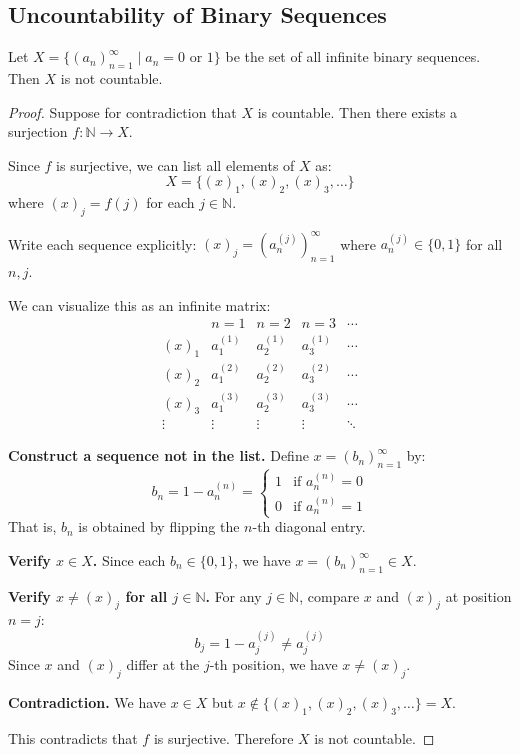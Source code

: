 \documentclass[11pt]{report}
\begin{document}
\subsection{Uncountability of Binary Sequences}

\begin{exbox}
Let $X = \{(a_n)_{n=1}^\infty \mid a_n = 0 \text{ or } 1\}$ be the set of all infinite binary sequences. Then $X$ is not countable.
\end{exbox}

\begin{proof}
Suppose for contradiction that $X$ is countable. Then there exists a surjection $f: \mathbb{N} \to X$.

Since $f$ is surjective, we can list all elements of $X$ as:
\[
X = \{(x)_1, (x)_2, (x)_3, \ldots\}
\]
where $(x)_j = f(j)$ for each $j \in \mathbb{N}$.

Write each sequence explicitly: $(x)_j = (a_n^{(j)})_{n=1}^\infty$ where $a_n^{(j)} \in \{0, 1\}$ for all $n, j$.

We can visualize this as an infinite matrix:
\[
\begin{array}{c|cccc}
 & n=1 & n=2 & n=3 & \cdots \\
\hline
(x)_1 & \boxed{a_1^{(1)}} & a_2^{(1)} & a_3^{(1)} & \cdots \\
(x)_2 & a_1^{(2)} & \boxed{a_2^{(2)}} & a_3^{(2)} & \cdots \\
(x)_3 & a_1^{(3)} & a_2^{(3)} & \boxed{a_3^{(3)}} & \cdots \\
\vdots & \vdots & \vdots & \vdots & \ddots
\end{array}
\]

\textbf{Construct a sequence not in the list.} Define $x = (b_n)_{n=1}^\infty$ by:
\[
b_n = 1 - a_n^{(n)} = \begin{cases} 1 & \text{if } a_n^{(n)} = 0 \\ 0 & \text{if } a_n^{(n)} = 1 \end{cases}
\]
That is, $b_n$ is obtained by flipping the $n$-th diagonal entry.

\textbf{Verify $x \in X$.} Since each $b_n \in \{0, 1\}$, we have $x = (b_n)_{n=1}^\infty \in X$.

\textbf{Verify $x \neq (x)_j$ for all $j \in \mathbb{N}$.} For any $j \in \mathbb{N}$, compare $x$ and $(x)_j$ at position $n = j$:
\[
b_j = 1 - a_j^{(j)} \neq a_j^{(j)}
\]
Since $x$ and $(x)_j$ differ at the $j$-th position, we have $x \neq (x)_j$.

\textbf{Contradiction.} We have $x \in X$ but $x \notin \{(x)_1, (x)_2, (x)_3, \ldots\} = X$.

This contradicts that $f$ is surjective. Therefore $X$ is not countable.
\end{proof}
\end{document}
